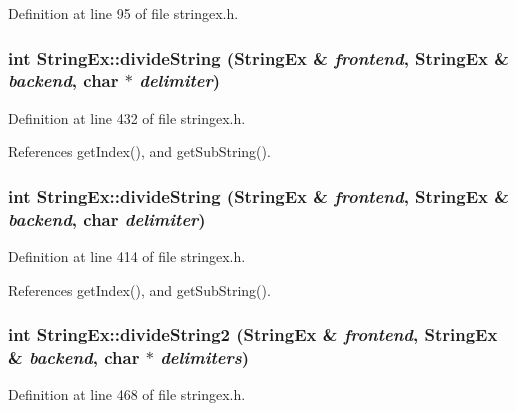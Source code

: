 Definition at line 95 of file stringex.h.\hypertarget{classStringEx_22095ec14f3644b9ff326921bc7b65a1}{
\subsubsection[{divideString}]{\setlength{\rightskip}{0pt plus 5cm}int StringEx::divideString ({\bf StringEx} \& {\em frontend}, \/  {\bf StringEx} \& {\em backend}, \/  char $\ast$ {\em delimiter})}}
\label{classStringEx_22095ec14f3644b9ff326921bc7b65a1}




Definition at line 432 of file stringex.h.

References getIndex(), and getSubString().\hypertarget{classStringEx_104a561876d7b585b981951e99696874}{
\subsubsection[{divideString}]{\setlength{\rightskip}{0pt plus 5cm}int StringEx::divideString ({\bf StringEx} \& {\em frontend}, \/  {\bf StringEx} \& {\em backend}, \/  char {\em delimiter})}}
\label{classStringEx_104a561876d7b585b981951e99696874}




Definition at line 414 of file stringex.h.

References getIndex(), and getSubString().\hypertarget{classStringEx_bc9bd1b51ebefa56475a3d33ddca7550}{
\subsubsection[{divideString2}]{\setlength{\rightskip}{0pt plus 5cm}int StringEx::divideString2 ({\bf StringEx} \& {\em frontend}, \/  {\bf StringEx} \& {\em backend}, \/  char $\ast$ {\em delimiters})}}
\label{classStringEx_bc9bd1b51ebefa56475a3d33ddca7550}




Definition at line 468 of file stringex.h.


